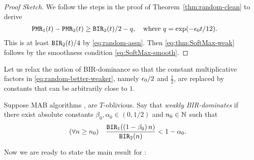 \begin{proof}[Proof Sketch]
We follow the steps in the proof of Theorem~\ref{thm:random-clean} to derive \begin{align*}
\mathtt{PMR}_1(t) - \mathtt{PMR}_2(t)
    &\geq \mathtt{BIR}_2(t)/2 -q,
    \quad \text{where $q = \exp(-\epsilon_0 t/12)$.}
\end{align*}
This is at least $\mathtt{BIR}_2(t)/4$ by \eqref{eq:random-assn}. Then \eqref{eq:thm:SoftMax-weak} follows by the smoothness condition \eqref{eq:SoftMax-smooth}.
\end{proof}


Let us relax the notion of BIR-dominance so that the constant multiplicative factors in \eqref{eq:random-better-weaker}, namely
 $\epsilon_0/2$ and $\tfrac12$, are replaced by constants that can be arbitrarily close to $1$.

\begin{definition}
Suppose MAB algorithms \alg[1],  \alg[2] are $T$-oblivious. Say that
\alg[1] \emph{weakly BIR-dominates} \alg[2] if there exist
absolute  constants $\beta_0, \alpha_0\in (0, 1/2)$ and $n_0\in\mathbb{N}$ such that
 \begin{align}\label{eq:SoftMax-better}
   (\forall n\geq n_0) \quad
   \frac{\mathtt{BIR}_1((1-\beta_0)\, n)}{\mathtt{BIR}_2(n)} <1-\alpha_0.
 \end{align}
 \end{definition}


Now we are ready to state the main result for \SoftMaxRandom:

